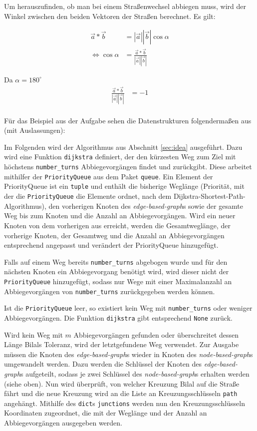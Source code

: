 \documentclass[a4paper,10pt,ngerman]{scrartcl}
\begin{document}
Um herauszufinden, ob man bei einem Straßenwechsel abbiegen muss, wird der Winkel zwischen den beiden Vektoren der Straßen berechnet.
Es gilt:

\begin{align*}
  \vec{a}*\vec{b} &= |\vec{a}||\vec{b}|\cos{\alpha} \\
  \Leftrightarrow \cos{\alpha} &= \frac{\vec{a}*\vec{b}}{|\vec{a}||\vec{b}|}
\end{align*}

Da $\alpha = 180^{\circ}$
\begin{align*}
  \frac{\vec{a}*\vec{b}}{|\vec{a}||\vec{b}|} &= -1 \\
\end{align*}


Für das Beispiel aus der Aufgabe sehen die Datenstrukturen folgendermaßen aus (mit Auslassungen):



Im Folgenden wird der Algorithmus aus Abschnitt \ref{sec:idea} ausgeführt.
Dazu wird eine Funktion \texttt{dijkstra} definiert, der den kürzesten Weg zum Ziel mit höchstens \texttt{number\_turns} Abbiegevorgängen findet und zurückgibt.
Diese arbeitet mithilfer der \texttt{PriorityQueue} aus dem Paket \texttt{queue}.
Ein Element der PriorityQueue ist ein \texttt{tuple} und enthält die bisherige Weglänge (Priorität, mit der die \texttt{PriorityQueue} die Elemente ordnet, nach dem Dijkstra-Shortest-Path-Algorithmus), den vorherigen Knoten des \textit{edge-based-graph}s sowie der gesamte Weg bis zum Knoten und die Anzahl an Abbiegevorgängen.
Wird ein neuer Knoten von dem vorherigen aus erreicht, werden die Gesamtweglänge, der vorherige Knoten, der Gesamtweg und die Anzahl an Abbiegevorgängen entsprechend angepasst und verändert der PriorityQueue hinzugefügt.

Falls auf einem Weg bereits \texttt{number\_turns} abgebogen wurde und für den nächsten Knoten ein Abbiegevorgang benötigt wird, wird dieser nicht der \texttt{PriorityQueue} hinzugefügt, sodass nur Wege mit einer Maximalanzahl an Abbiegevorgängen von \texttt{number\_turns} zurückgegeben werden können.

Ist die \texttt{PriorityQueue} leer, so existiert kein Weg mit \texttt{number\_turns} oder weniger Abbiegevorgängen.
Die Funktion \texttt{dijkstra} gibt entsprechend \texttt{None} zurück.

Wird kein Weg mit $m$ Abbiegevorgängen gefunden oder überschreitet dessen Länge Bilals Toleranz, wird der letztgefundene Weg verwendet.
Zur Ausgabe müssen die Knoten des \textit{edge-based-graph}s wieder in Knoten des \textit{node-based-graph}s umgewandelt werden.
Dazu werden die Schlüssel der Knoten des \textit{edge-based-graph}s aufgeteilt, sodass je zwei Schlüssel des \textit{node-based-graph}s erhalten werden (siehe oben).
Nun wird überprüft, von welcher Kreuzung Bilal auf die Straße fährt und die neue Kreuzung wird an die Liste an Kreuzungsschlüsseln \texttt{path} angehängt.
Mithilfe des \texttt{dict}s \texttt{junctions} werden nun den Kreuzungsschlüsseln Koordinaten zugeordnet, die mit der Weglänge und der Anzahl an Abbiegevorgängen ausgegeben werden.
\end{document}
